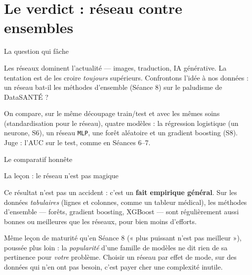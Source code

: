 \documentclass[aspectratio=169,11pt]{beamer}
\begin{document}
\section{Le verdict : réseau contre ensembles}

\begin{frame}{La question qui fâche}
\begin{ucadfront}
{\small Les réseaux dominent l'actualité — images, traduction, IA générative. La tentation est de les croire \emph{toujours} supérieurs. Confrontons l'idée à nos données : un réseau bat-il les méthodes d'ensemble (Séance 8) sur le paludisme de DataSANTÉ ?}
\end{ucadfront}
{\small On compare, sur le même découpage train/test et avec les mêmes soins (standardisation pour le réseau), quatre modèles : la régression logistique (un neurone, S6), un réseau \texttt{MLP}, une forêt aléatoire et un gradient boosting (S8). Juge : l'AUC sur le test, comme en Séances 6–7.}
\end{frame}

\begin{frame}{Le comparatif honnête}
\end{frame}

\begin{frame}{La leçon : le réseau n'est pas magique}
\begin{ucadret}
{\small Ce résultat n'est pas un accident : c'est un \textbf{fait empirique général}. Sur les données \emph{tabulaires} (lignes et colonnes, comme un tableur médical), les méthodes d'ensemble — forêts, gradient boosting, XGBoost — sont régulièrement aussi bonnes ou meilleures que les réseaux, pour bien moins d'efforts.}
\end{ucadret}
{\small Même leçon de maturité qu'en Séance 8 (« plus puissant n'est pas meilleur »), poussée plus loin : la \emph{popularité} d'une famille de modèles ne dit rien de sa pertinence pour \emph{votre} problème. Choisir un réseau par effet de mode, sur des données qui n'en ont pas besoin, c'est payer cher une complexité inutile.}
\end{frame}
\end{document}
